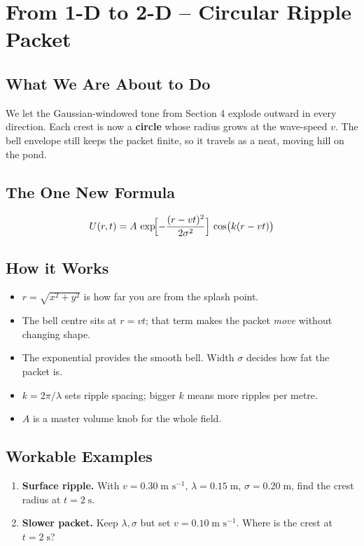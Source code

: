 \documentclass[12pt]{article}
\begin{document}
\section{From 1-D to 2-D – Circular Ripple Packet}

\subsection*{What We Are About to Do}
We let the Gaussian-windowed tone from Section 4 explode outward in every direction.  
Each crest is now a \textbf{circle} whose radius grows at the wave-speed \(v\).  
The bell envelope still keeps the packet finite, so it travels as a neat, moving hill on the pond.

\subsection*{The One New Formula}
\begin{equation}
U(r,t)=A\,\exp\!\Bigl[-\frac{(r-vt)^2}{2\sigma^{2}}\Bigr]\,
\cos\bigl(k(r-vt)\bigr)
\end{equation}

\subsection*{How it Works}
\begin{itemize}
  \item \(r=\sqrt{x^{2}+y^{2}}\) is how far you are from the splash point.
  \item The bell centre sits at \(r=vt\); that term makes the packet \emph{move} without changing shape.
  \item The exponential provides the smooth bell.  Width \(\sigma\) decides how fat the packet is.
  \item \(k=2\pi/\lambda\) sets ripple spacing; bigger \(k\) means more ripples per metre.
  \item \(A\) is a master volume knob for the whole field.
\end{itemize}

\subsection*{Workable Examples}
\begin{enumerate}
  \item \textbf{Surface ripple.}  With \(v=0.30\;\text{m s}^{-1}\), \(\lambda=0.15\;\text{m}\), \(\sigma=0.20\;\text{m}\), find the crest radius at \(t=2\;\text{s}\).
  \item \textbf{Slower packet.}  Keep \(\lambda,\sigma\) but set \(v=0.10\;\text{m s}^{-1}\). Where is the crest at \(t=2\;\text{s}\)?
\end{enumerate}
\end{document}
